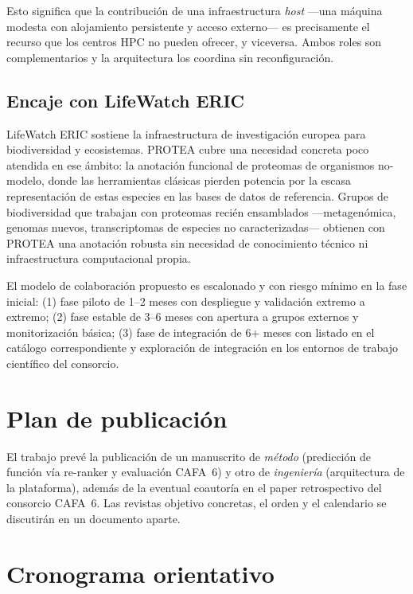 \documentclass[11pt,a4paper]{article}
\begin{document}
Esto significa que la contribución de una infraestructura \emph{host} —una
máquina modesta con alojamiento persistente y acceso externo— es precisamente
el recurso que los centros HPC no pueden ofrecer, y viceversa. Ambos roles son
complementarios y la arquitectura los coordina sin reconfiguración.

\subsection{Encaje con LifeWatch ERIC}

LifeWatch ERIC sostiene la infraestructura de investigación europea para
biodiversidad y ecosistemas. PROTEA cubre una necesidad concreta poco atendida
en ese ámbito: la anotación funcional de proteomas de organismos no-modelo,
donde las herramientas clásicas pierden potencia por la escasa representación
de estas especies en las bases de datos de referencia. Grupos de biodiversidad
que trabajan con proteomas recién ensamblados —metagenómica, genomas nuevos,
transcriptomas de especies no caracterizadas— obtienen con PROTEA una
anotación robusta sin necesidad de conocimiento técnico ni infraestructura
computacional propia.

El modelo de colaboración propuesto es escalonado y con riesgo mínimo en la
fase inicial: (1) fase piloto de 1–2 meses con despliegue y validación
extremo a extremo; (2) fase estable de 3–6 meses con apertura a grupos
externos y monitorización básica; (3) fase de integración de 6+ meses con
listado en el catálogo correspondiente y exploración de integración en los
entornos de trabajo científico del consorcio.

\section{Plan de publicación}

El trabajo prevé la publicación de un manuscrito de \emph{método} (predicción
de función vía re-ranker y evaluación CAFA~6) y otro de \emph{ingeniería}
(arquitectura de la plataforma), además de la eventual coautoría en el paper
retrospectivo del consorcio CAFA~6. Las revistas objetivo concretas, el orden
y el calendario se discutirán en un documento aparte.

\section{Cronograma orientativo}
\end{document}
